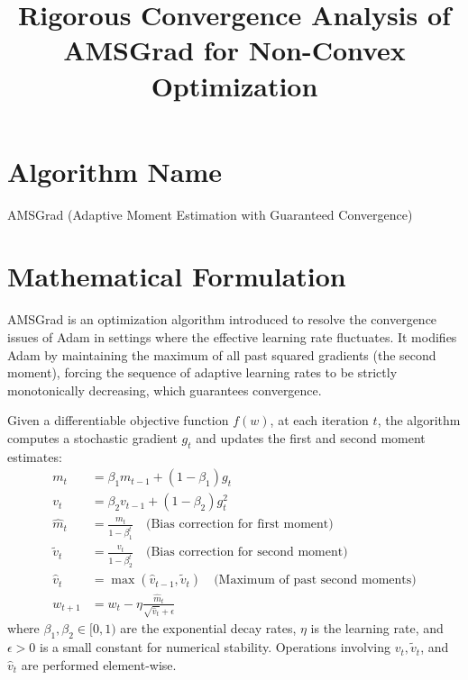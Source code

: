 \documentclass{article}
\title{Rigorous Convergence Analysis of AMSGrad for Non-Convex Optimization}
\author{}
\date{}
\begin{document}
\maketitle

\section*{Algorithm Name}
AMSGrad (Adaptive Moment Estimation with Guaranteed Convergence)

\section*{Mathematical Formulation}
AMSGrad is an optimization algorithm introduced to resolve the convergence issues of Adam in settings where the effective learning rate fluctuates. It modifies Adam by maintaining the maximum of all past squared gradients (the second moment), forcing the sequence of adaptive learning rates to be strictly monotonically decreasing, which guarantees convergence.

Given a differentiable objective function $f(w)$, at each iteration $t$, the algorithm computes a stochastic gradient $g_t$ and updates the first and second moment estimates:
\begin{align*}
    m_t &= \beta_1 m_{t-1} + (1-\beta_1)g_t \\
    v_t &= \beta_2 v_{t-1} + (1-\beta_2)g_t^2 \\
    \hat{m}_t &= \frac{m_t}{1-\beta_1^t} \quad \text{(Bias correction for first moment)} \\
    \tilde{v}_t &= \frac{v_t}{1-\beta_2^t} \quad \text{(Bias correction for second moment)} \\
    \hat{v}_t &= \max(\hat{v}_{t-1}, \tilde{v}_t) \quad \text{(Maximum of past second moments)} \\
    w_{t+1} &= w_t - \eta \frac{\hat{m}_t}{\sqrt{\hat{v}_t} + \epsilon}
\end{align*}
where $\beta_1, \beta_2 \in [0, 1)$ are the exponential decay rates, $\eta$ is the learning rate, and $\epsilon > 0$ is a small constant for numerical stability. Operations involving $v_t, \tilde{v}_t$, and $\hat{v}_t$ are performed element-wise.
\end{document}
